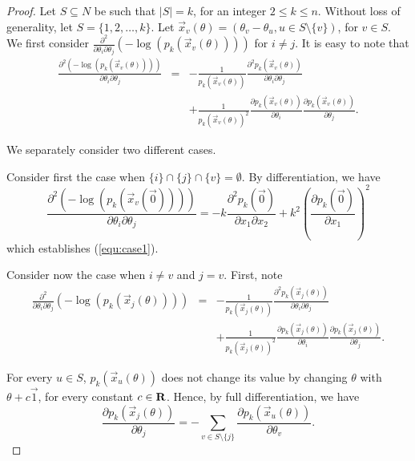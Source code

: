 \begin{proof} Let $S\subseteq N$ be such that $|S| = k$, for an integer $2\leq k \leq n$. Without loss of generality, let $S = \{1,2,\ldots,k\}$. Let $\vec{x}_v(\theta) = (\theta_v - \theta_u, u\in S\setminus \{v\})$, for $v\in S$. We first consider $\frac{\partial^2}{\partial \theta_i \partial \theta_j}(-\log(p_k(\vec{x}_v(\theta))))$ for $i\neq j$. It is easy to note that
\begin{eqnarray*}
\frac{\partial^2 (-\log(p_k(\vec{x}_v(\theta))))}{\partial \theta_i \partial \theta_j} 
&=& -\frac{1}{p_k(\vec{x}_v(\theta))}\frac{\partial^2 p_k(\vec{x}_v(\theta))}{\partial\theta_i \partial \theta_j}\nonumber\\
&&  + \frac{1}{p_k(\vec{x}_v(\theta))^2} \frac{\partial p_k(\vec{x}_v(\theta))}{\partial \theta_i}  \frac{\partial p_k(\vec{x}_v(\theta))}{\partial \theta_j}. 
\end{eqnarray*}

We separately consider two different cases. 

Consider first the case when $\{i\}\cap \{j\}\cap \{v\} = \emptyset$. By differentiation, we have 
$$
\frac{\partial^2 (-\log(p_k(\vec{x}_v(\vec{0}))))}{\partial \theta_i \partial \theta_j} 
= - k\frac{\partial^2 p_k(\vec{0})}{\partial x_1 \partial x_2}
 + k^2 \left(\frac{\partial p_k(\vec{0})}{\partial x_1}\right)^2
$$
which establishes (\ref{equ:case1}).

Consider now the case when $i \neq v$ and $j = v$. First, note
\begin{eqnarray}
\frac{\partial^2}{\partial \theta_i \partial \theta_j}(-\log(p_k(\vec{x}_j(\theta))))
&=& -\frac{1}{p_k(\vec{x}_j(\theta))}\frac{\partial^2 p_k(\vec{x}_j(\theta))}{\partial\theta_i \partial \theta_j}\nonumber\\
&&  + \frac{1}{p_k(\vec{x}_j(\theta))^2} \frac{\partial p_k(\vec{x}_j(\theta))}{\partial \theta_i}  \frac{\partial p_k(\vec{x}_j(\theta))}{\partial \theta_j}.
\label{equ:e0}
\end{eqnarray}

For every $u\in S$, $p_k(\vec{x}_u(\theta))$ does not change its value by changing $\theta$ with $\theta + c \vec{1}$, for every constant $c\in \mathbf{R}$. Hence, by full differentiation, we have
\begin{equation}
\frac{\partial p_k(\vec{x}_j(\theta))}{\partial \theta_j} = -\sum_{v\in S \setminus \{j\}} \frac{\partial p_k(\vec{x}_u(\theta))}{\partial \theta_v}.
\label{equ:fulldiff}
\end{equation}


\end{proof}
